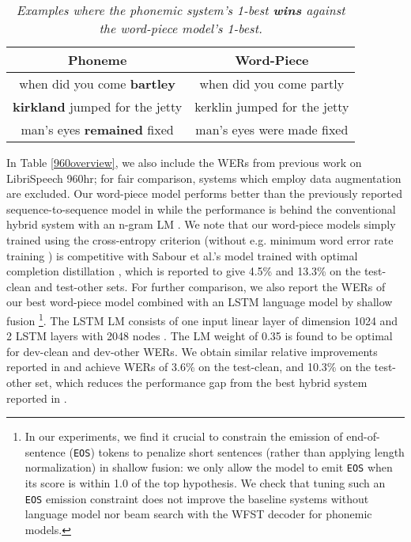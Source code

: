 \documentclass[a4paper]{article}
\begin{document}
\begin{table}[h]
	\centering
\vspace{-2mm}
	\caption{\it Examples where the phonemic system's 1-best \textbf{wins} against the word-piece model's 1-best.}
\vspace{-4mm}
	\label{plg_vs_wp}
	\begin{tabular}{ |c|c|} \hline
		Phoneme  & Word-Piece    \\ \hline
		when did you come \textbf{bartley} & when did you come partly    \\
		\textbf{kirkland} jumped for the jetty & kerklin jumped for the jetty \\ 
		man's eyes \textbf{remained} fixed & man's eyes were made fixed  \\ \hline
	\end{tabular}
		\vspace{-2mm}
\end{table}


In Table  \ref{960overview}, we also include the WERs from previous work on LibriSpeech 960hr; for fair comparison, systems which employ data augmentation \cite{park2019specaugment} are excluded.
Our word-piece model performs better than the previously reported sequence-to-sequence model
in \cite{zeyer2018:asr-attention} while the performance is behind the conventional hybrid system with
an n-gram LM \cite{han2017capio}. We note that our word-piece models simply trained using the cross-entropy criterion
(without e.g. minimum word error rate training \cite{PrabhavalkarSWN18}) is competitive with
Sabour et al.'s model trained with optimal completion distillation \cite{sabour2018optimal}, which is reported to give 4.5\% and 13.3\% on the test-clean and test-other sets.
For further comparison, we also report the WERs of our best word-piece model combined with an LSTM language model \cite{sundermeyer2012lstm} by shallow fusion \cite{ChorowskiJ17, toshniwal2018comparison}\footnote{In our experiments,
we find it crucial to constrain the emission of end-of-sentence (\texttt{EOS}) tokens \cite{ChorowskiJ17} to penalize short sentences
(rather than applying length normalization) in shallow fusion:
we only allow the model to emit \texttt{EOS} when its score is within 1.0 of the top hypothesis. We check that tuning such an \texttt{EOS} emission
constraint does not improve the baseline systems without language model
nor beam search with the WFST decoder for phonemic models.}.
The LSTM LM consists of one input linear layer of dimension 1024 and 2 LSTM layers with 2048 nodes \cite{hochreiter1997long}.
The LM weight of 0.35 is found to be optimal for dev-clean and dev-other WERs.
We obtain similar relative improvements reported in \cite{zeyer2018:asr-attention} and achieve WERs of 3.6\%
on the test-clean, and 10.3\% on the test-other set, which reduces the performance gap from the best hybrid system reported in \cite{han2017capio}.
\end{document}

